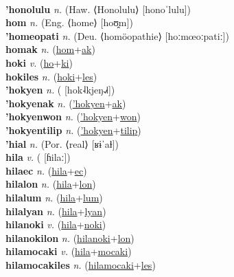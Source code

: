  \label{holyan} \\
\textbf{'honolulu} \textit{n.} (Haw. ⟨Honolulu⟩ [honoˈlulu])
 \label{'honolulu} \\
\textbf{hom} \textit{n.} (Eng. ⟨home⟩ [hoʊ̯m])
 \label{hom} \\
\textbf{'homeopati} \textit{n.} (Deu. ⟨homöopathie⟩ [hoːmœoːpatiː])
 \label{'homeopati} \\
\textbf{homak} \textit{n.} (\hyperref[hom]{hom}+\hyperref[ak]{ak})
 \label{homak} \\
\textbf{hoki} \textit{v.} (\hyperref[ho]{ho}+\hyperref[ki]{ki})
 \label{hoki} \\
\textbf{hokiles} \textit{n.} (\hyperref[hoki]{hoki}+\hyperref[les]{les})
 \label{hokiles} \\
\textbf{'hokyen} \textit{n.} ( [hok˨kjeŋ˨˩˧])
 \label{'hokyen} \\
\textbf{'hokyenak} \textit{n.} (\hyperref['hokyen]{'hokyen}+\hyperref[ak]{ak})
 \label{'hokyenak} \\
\textbf{'hokyenwon} \textit{n.} (\hyperref['hokyen]{'hokyen}+\hyperref[won]{won})
 \label{'hokyenwon} \\
\textbf{'hokyentilip} \textit{n.} (\hyperref['hokyen]{'hokyen}+\hyperref[tilip]{tilip})
 \label{'hokyentilip} \\
\textbf{'hial} \textit{n.} (Por. ⟨real⟩ [ʁɨˈaɫ])
 \label{'hial} \\
\textbf{hila} \textit{v.} ( [ɦilaː])
 \label{hila} \\
\textbf{hilaec} \textit{n.} (\hyperref[hila]{hila}+\hyperref[ec]{ec})
 \label{hilaec} \\
\textbf{hilalon} \textit{n.} (\hyperref[hila]{hila}+\hyperref[lon]{lon})
 \label{hilalon} \\
\textbf{hilalum} \textit{n.} (\hyperref[hila]{hila}+\hyperref[lum]{lum})
 \label{hilalum} \\
\textbf{hilalyan} \textit{n.} (\hyperref[hila]{hila}+\hyperref[lyan]{lyan})
 \label{hilalyan} \\
\textbf{hilanoki} \textit{v.} (\hyperref[hila]{hila}+\hyperref[noki]{noki})
 \label{hilanoki} \\
\textbf{hilanokilon} \textit{n.} (\hyperref[hilanoki]{hilanoki}+\hyperref[lon]{lon})
 \label{hilanokilon} \\
\textbf{hilamocaki} \textit{v.} (\hyperref[hila]{hila}+\hyperref[mocaki]{mocaki})
 \label{hilamocaki} \\
\textbf{hilamocakiles} \textit{n.} (\hyperref[hilamocaki]{hilamocaki}+\hyperref[les]{les})
